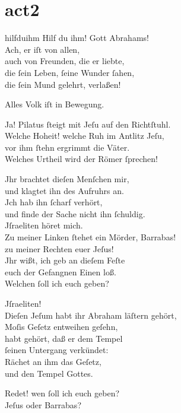 \documentclass[abbrwidth=6em,tocstyle=ref-genre,toe=false]{ees}
\begin{document}
{\part{act2}

\begin{movement}{hilfduihm}
  \voice[Blindgebohrner]
  Hilf du ihm! Gott Abrahams!\\
  Ach, er iſt von allen,\\
  auch von Freunden, die er liebte,\\
  die ſein Leben, ſeine Wunder ſahen,\\
  die ſein Mund gelehrt, verlaßen!

  \voice[Fremdling]
  Alles Volk iſt in Bewegung.

  \voice[Blindgebohrner]
  Ja! Pilatus ſteigt mit Jeſu auf den Richtſtuhl.\\
  Welche Hoheit! welche Ruh im Antlitz Jeſu,\\
  vor ihm ſtehn ergrimmt die Väter.\\
  Welches Urtheil wird der Römer ſprechen!

  \voice[Pilatus]
  Jhr brachtet dieſen Menſchen mir,\\
  und klagtet ihn des Aufruhrs an.\\
  Jch hab ihn ſcharf verhört,\\
  und finde der Sache nicht ihn ſchuldig.\\
  Jſraeliten höret mich.\\
  Zu meiner Linken ſtehet ein Mörder, Barrabas!\\
  zu meiner Rechten euer Jeſus!\\
  Jhr wißt, ich geb an dieſem Feſte\\
  euch der Gefangnen Einen loß.\\
  Welchen ſoll ich euch geben?

  \voice[Kaiphas]
  Jſraeliten!\\
  Dieſen Jeſum habt ihr Abraham läſtern gehört,\\
  Moſis Geſetz entweihen geſehn,\\
  habt gehört, daß er dem Tempel\\
  ſeinen Untergang verkündet:\\
  Rächet an ihm das Geſetz,\\
  und den Tempel Gottes.

  \voice[Pilatus]
  Redet! wen ſoll ich euch geben?\\
  Jeſus oder Barrabas?


\end{movement}}
\end{document}
